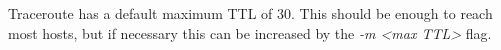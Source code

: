 Traceroute has a default maximum TTL of $30$. This should be enough to reach most hosts, but if necessary this can be increased by the \textit{-m <max TTL>} flag.